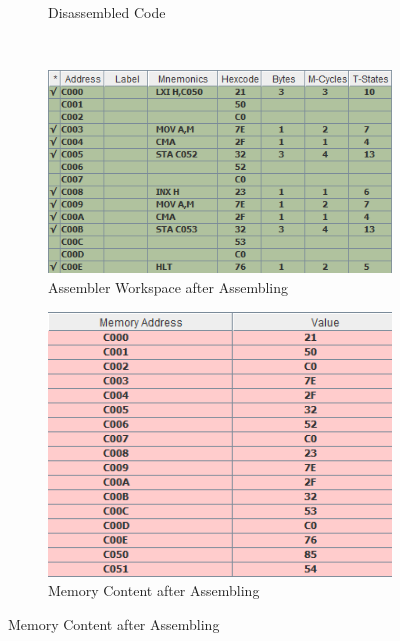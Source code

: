 \begin{figure}[htbp]
\begin{subfigure}[b]{0.3\textwidth}
                       \caption{Disassembled Code}
                       \label{fig:s1dis}
               \end{subfigure}
		\\        \vspace{20pt}
       \begin{subfigure}[b]{0.5\textwidth}
                       \includegraphics[width=\textwidth]{sampleCode1Asm}
                       \caption{Assembler Workspace after Assembling}
                       \label{fig:s1asmWork}
               \end{subfigure}
       \begin{subfigure}[b]{0.4\textwidth}
                       \includegraphics[width=\textwidth]{sampleCode1Mem}
                       \caption{Memory Content after Assembling}
                       \label{fig:s1asmMem}
               \end{subfigure}    

\end{figure}
